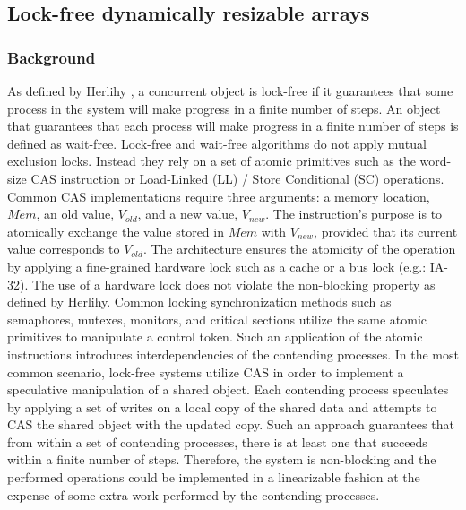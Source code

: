 




\subsection{Lock-free dynamically resizable arrays \cite{Dechev2006}}

\subsubsection{Background}

As defined by Herlihy \cite{Herlihy1993}, a concurrent object is
lock-free if it guarantees that some process in the system will make
progress in a finite number of steps. An object that guarantees that
each process will make progress in a finite number of steps is defined
as wait-free. Lock-free and wait-free algorithms do not apply mutual
exclusion locks. Instead they rely on a set of atomic primitives such
as the word-size CAS instruction or Load-Linked (LL) / Store
Conditional (SC) operations. Common CAS implementations require three
arguments: a memory location, $Mem$, an old value, $V_{old}$, and a
new value, $V_{new}$. The instruction's purpose is to atomically
exchange the value stored in $Mem$ with $V_{new}$, provided that its
current value corresponds to $V_{old}$. The architecture ensures the
atomicity of the operation by applying a fine-grained hardware lock
such as a cache or a bus lock (e.g.: IA-32). The use of a hardware
lock does not violate the non-blocking property as defined by
Herlihy. Common locking synchronization methods such as semaphores,
mutexes, monitors, and critical sections utilize the same atomic
primitives to manipulate a control token. Such an application of the
atomic instructions introduces interdependencies of the contending
processes. In the most common scenario, lock-free systems utilize CAS
in order to implement a speculative manipulation of a shared
object. Each contending process speculates by applying a set of writes
on a local copy of the shared data and attempts to CAS the shared
object with the updated copy. Such an approach guarantees that from
within a set of contending processes, there is at least one that
succeeds within a finite number of steps. Therefore, the system is
non-blocking and the performed operations could be implemented in a
linearizable fashion at the expense of some extra work performed by
the contending processes.

